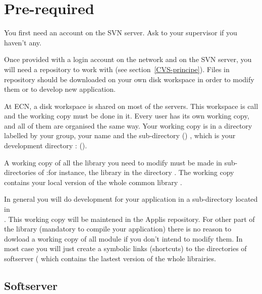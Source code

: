 


\section{Pre-required}

You first need an account on the SVN server. Ask to your supervisor if you haven't any.

Once provided with a login account on the network and on the SVN
server, you will need a repository to work with (see
section~\ref{CVS-principe}). Files in repository
should be downloaded on your own disk workspace in order to modify them or to develop new application.

At ECN, a disk workspace is shared on most of the servers. This workspace is call  and the working copy must be done in it. Every user has its
own working copy, and all of them are organised the same way.
Your working copy is in a directory labelled by your group, your name and the sub-directory () , which is your development directory :
().

A working copy of all the library you need to modify must be made in
sub-directories of  :for instance, the library
 in the directory
. The working copy 
contains your local version of the whole common library .

In general you will do development for your application in a sub-directory located in \\ 
 . This working copy will be maintened in the Applis repository. For other part of the library (mandatory to compile your application) there is no reason to dowload a working copy of all module if you don't intend to modify them. In most case 
you will just create a symbolic links (shortcuts) to the directories of softserver (  which contains the lastest version of the whole librairies.


\subsection{Softserver}

